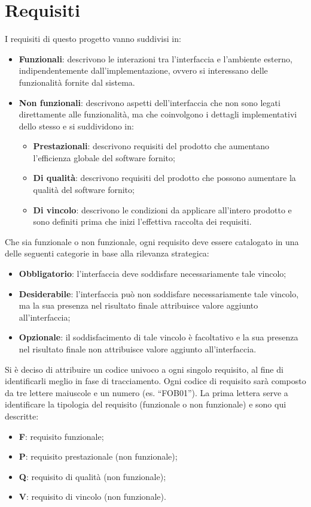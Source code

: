 \section{Requisiti}
I requisiti di questo progetto vanno suddivisi in:
\begin{itemize}
\item \textbf{Funzionali}: descrivono le interazioni tra l'interfaccia e l'ambiente esterno, indipendentemente
dall'implementazione, ovvero si interessano delle funzionalità fornite dal sistema.
\item \textbf{Non funzionali}: descrivono aspetti dell'interfaccia che non sono legati direttamente alle funzionalità, ma che coinvolgono i dettagli implementativi dello stesso e si suddividono in:
\begin{itemize}
\item \textbf{Prestazionali}: descrivono requisiti del prodotto che aumentano l'efficienza globale del
software fornito;
\item \textbf{Di qualità}: descrivono requisiti del prodotto che possono aumentare la qualità del software
fornito;
\item \textbf{Di vincolo}: descrivono le condizioni da applicare all'intero prodotto e sono definiti prima che inizi l'effettiva raccolta dei requisiti.
\end{itemize}
\end{itemize}
Che sia funzionale o non funzionale, ogni requisito deve essere catalogato in una delle seguenti
categorie in base alla rilevanza strategica:
\begin{itemize}
\item \textbf{Obbligatorio}: l'interfaccia deve soddisfare necessariamente tale vincolo;
\item \textbf{Desiderabile}: l'interfaccia può non soddisfare necessariamente tale vincolo, ma la sua presenza nel risultato finale attribuisce valore aggiunto all'interfaccia;
\item \textbf{Opzionale}: il soddisfacimento di tale vincolo è facoltativo e la sua presenza nel risultato finale non attribuisce valore aggiunto all'interfaccia.
\end{itemize}
Si è deciso di attribuire un codice univoco a ogni singolo requisito, al fine di identificarli meglio
in fase di tracciamento. Ogni codice di requisito sarà composto da tre lettere maiuscole e un
numero (es. “FOB01”). La prima lettera serve a identificare la tipologia del requisito (funzionale
o non funzionale) e sono qui descritte:
\begin{itemize}
\item \textbf{F}: requisito funzionale;
\item \textbf{P}: requisito prestazionale (non funzionale);
\item \textbf{Q}: requisito di qualità (non funzionale);
\item \textbf{V}: requisito di vincolo (non funzionale).
\end{itemize}
